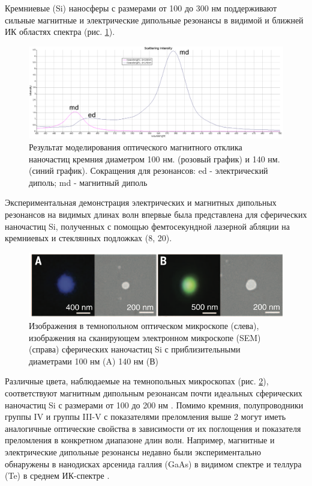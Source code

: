 Кремниевые (Si) наносферы с размерами от 100 до 300 нм поддерживают сильные магнитные и электрические дипольные резонансы в видимой и ближней ИК областях спектра (рис. \ref{fig2}). 
 \begin{figure}[h!]
	\centering
	\includegraphics[width=0.7\linewidth]{images/graph1.png}
	\caption{Результат моделирования оптического магнитного отклика наночастиц кремния  диаметром 100 нм. (розовый график) и 140 нм. (синий график).  Сокращения для резонансов: ed - электрический диполь; md - магнитный диполь}
	\label{fig2}
\end{figure}
Экспериментальная демонстрация электрических и магнитных дипольных резонансов на видимых длинах волн впервые была представлена для сферических наночастиц Si, полученных с помощью фемтосекундной лазерной абляции на кремниевых и стеклянных подложках (8, 20). 
 \begin{figure}[h!]
	\centering
	\includegraphics[width=0.7\linewidth]{images/fig2.png}
	\caption{ Изображения в темнопольном оптическом микроскопе (слева), изображения на сканирующем электронном микроскопе (SEM) (справа)  сферических наночастиц Si с приблизительными диаметрами 100 нм (A) 140 нм (В)  \cite{magnLight}}
	\label{fig3}
\end{figure}
\hspace*{2mm}Различные цвета, наблюдаемые на темнопольных микроскопах (рис. \ref{fig3}), соответствуют магнитным дипольным резонансам почти идеальных сферических наночастиц Si с размерами от 100 до 200 нм \cite{magnLight}.  Помимо кремния, полупроводники группы IV и группы III-V с показателями преломления выше 2 могут иметь аналогичные оптические свойства в зависимости от их поглощения и показателя преломления в конкретном диапазоне длин волн. Например, магнитные и электрические дипольные резонансы недавно были экспериментально обнаружены в нанодисках арсенида галлия (GaAs) в видимом спектре \cite{demSeroNanoprt} и теллура (Te) в среднем ИК-спектре .



